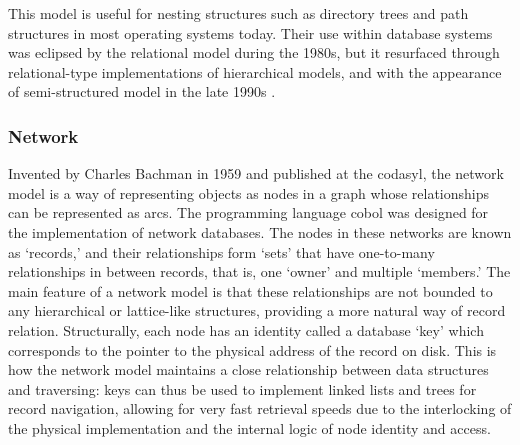 This model is useful for nesting structures such as directory trees and path structures in most operating systems today. Their use within database systems was eclipsed by the relational model during the 1980s, but it resurfaced through relational-type implementations of hierarchical models, and with the appearance of semi-structured model in the late 1990s .

\subsubsection{Network}
\label{model:network}


Invented by Charles Bachman in 1959 and published at the \gls{codasyl}, the network model is a way of representing objects as nodes in a graph whose relationships can be represented as arcs. The programming language \gls{cobol} was designed for the implementation of network databases. The nodes in these networks are known as `records,' and their relationships form `sets' that have one-to-many relationships in between records, that is, one `owner' and multiple `members.' The main feature of a network model is that these relationships are not bounded to any hierarchical or lattice-like structures, providing a more natural way of record relation. Structurally, each node has an identity called a database `key' which corresponds to the pointer to the physical address of the record on disk. This is how the network model maintains a close relationship between data structures and traversing: keys can thus be used to implement linked lists and trees for record navigation, allowing for very fast retrieval speeds due to the interlocking of the physical implementation and the internal logic of node identity and access.

